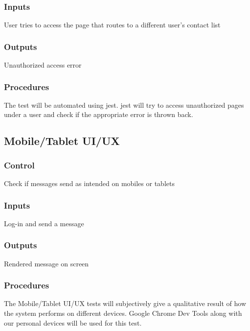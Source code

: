 \documentclass[12pt, titlepage]{article}
\begin{document}
\subsubsection{Inputs}
User tries to access the page that routes to a different user's contact list
\subsubsection{Outputs}
Unauthorized access error
\subsubsection{Procedures}
The test will be automated using jest. jest will try to access unauthorized pages under a user and check if the appropriate error is thrown back.
\subsection{Mobile/Tablet UI/UX}
\subsubsection{Control}
Check if messages send as intended on mobiles or tablets
\subsubsection{Inputs}
Log-in and send a message
\subsubsection{Outputs}
Rendered message on screen
\subsubsection{Procedures}
The Mobile/Tablet UI/UX tests will subjectively give a qualitative result of how the system performs on different devices. Google Chrome Dev Tools along with our personal devices will be used for this test.
	
\end{document}
